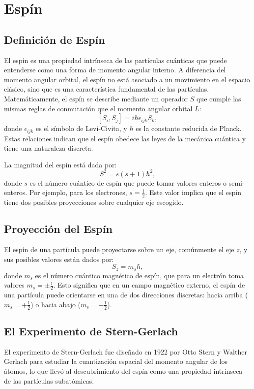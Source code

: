 \newpage
\section{Espín}
\noindent

\subsection*{Definición de Espín}
\noindent
El espín es una propiedad intrínseca de las partículas cuánticas que puede entenderse como una forma de momento angular interno. A diferencia del momento angular orbital, el espín no está asociado a un movimiento en el espacio clásico, sino que es una característica fundamental de las partículas. Matemáticamente, el espín se describe mediante un operador $S$ que cumple las mismas reglas de conmutación que el momento angular orbital $L$:
\[
[S_i, S_j] = i\hbar \epsilon_{ijk} S_k,
\]
donde $\epsilon_{ijk}$ es el símbolo de Levi-Civita, y $\hbar$ es la constante reducida de Planck. Estas relaciones indican que el espín obedece las leyes de la mecánica cuántica y tiene una naturaleza discreta.

\noindent
La magnitud del espín está dada por:
\[
S^2 = s(s+1)\hbar^2,
\]
donde $s$ es el número cuántico de espín que puede tomar valores enteros o semi-enteros. Por ejemplo, para los electrones, $s = \frac{1}{2}$. Este valor implica que el espín tiene dos posibles proyecciones sobre cualquier eje escogido.

\subsection*{Proyección del Espín}
\noindent
El espín de una partícula puede proyectarse sobre un eje, comúnmente el eje $z$, y sus posibles valores están dados por:
\[
S_z = m_s \hbar,
\]
donde $m_s$ es el número cuántico magnético de espín, que para un electrón toma valores $m_s = \pm\frac{1}{2}$. Esto significa que en un campo magnético externo, el espín de una partícula puede orientarse en una de dos direcciones discretas: hacia arriba ($m_s = +\frac{1}{2}$) o hacia abajo ($m_s = -\frac{1}{2}$).

\subsection*{El Experimento de Stern-Gerlach}
\noindent
El experimento de Stern-Gerlach fue diseñado en 1922 por Otto Stern y Walther Gerlach para estudiar la cuantización espacial del momento angular de los átomos, lo que llevó al descubrimiento del espín como una propiedad intrínseca de las partículas subatómicas.

